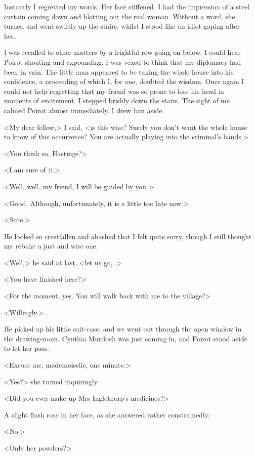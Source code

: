  Instantly I regretted my words. Her face stiffened. I had the impression of a steel curtain coming down and blotting out the real woman. Without a word, she turned and went swiftly up the stairs, whilst I stood like an idiot gaping after her. 

 I was recalled to other matters by a frightful row going on below. I could hear Poirot shouting and expounding. I was vexed to think that my diplomacy had been in vain. The little man appeared to be taking the whole house into his confidence, a proceeding of which I, for one, doubted the wisdom. Once again I could not help regretting that my friend was so prone to lose his head in moments of excitement. I stepped briskly down the stairs. The sight of me calmed Poirot almost immediately. I drew him aside. 

 <My dear fellow,> I said, <is this wise? Surely you don't want the whole house to know of this occurrence? You are actually playing into the criminal's hands.> 

 <You think so, Hastings?> 

 <I am sure of it.> 

 <Well, well, my friend, I will be guided by you.> 

 <Good. Although, unfortunately, it is a little too late now.> 

 <Sure.> 

 He looked so crestfallen and abashed that I felt quite sorry, though I still thought my rebuke a just and wise one. 

 <Well,> he said at last, <let us go, .> 

 <You have finished here?> 

 <For the moment, yes. You will walk back with me to the village?> 

 <Willingly.> 

 He picked up his little suit-case, and we went out through the open window in the drawing-room. Cynthia Murdoch was just coming in, and Poirot stood aside to let her pass. 

 <Excuse me, mademoiselle, one minute.> 

 <Yes?> she turned inquiringly. 

 <Did you ever make up Mrs Inglethorp's medicines?> 

 A slight flush rose in her face, as she answered rather constrainedly: 

 <No.> 

 <Only her powders?> 

